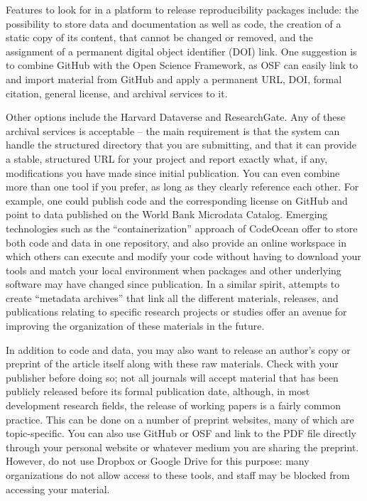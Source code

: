 Features to look for in a platform to release reproducibility packages include:
the possibility to store data and documentation as well as code,
the creation of a static copy of its content, that cannot be changed or removed,
and the assignment of a permanent digital object identifier (DOI) link.
One suggestion is to combine GitHub with the Open Science Framework,
as OSF can easily link to and import material from GitHub and
apply a permanent URL, DOI, formal citation, general license, and archival services to it.

Other options include the Harvard Dataverse
and ResearchGate.
Any of these archival services is acceptable --
the main requirement is that the system can handle
the structured directory that you are submitting,
and that it can provide a stable, structured URL for your project
and report exactly what, if any,
modifications you have made since initial publication.
You can even combine more than one tool if you prefer,
as long as they clearly reference each other.
For example, one could publish code and the corresponding license on GitHub
and point to data published on the World Bank Microdata Catalog.
Emerging technologies such as the ``containerization'' approach of CodeOcean
offer to store both code and data in one repository,
and also provide an online workspace in which others can execute and modify your code
without having to download your tools and match your local environment
when packages and other underlying software may have changed since publication.
In a similar spirit, attempts to create ``metadata archives''
that link all the different materials, releases, and publications
relating to specific research projects or studies
offer an avenue for improving the organization of these materials in the future.

In addition to code and data,
you may also want to release an author's copy or preprint
of the article itself along with these raw materials.
Check with your publisher before doing so;
not all journals will accept material that has been publicly released
before its formal publication date, although,
in most development research fields,
the release of working papers is a fairly common practice.
This can be done on a number of preprint websites,
many of which are topic-specific.
You can also use GitHub or OSF and link to the PDF file directly
through your personal website or whatever medium you are sharing the preprint.
However, do not use Dropbox or Google Drive for this purpose:
many organizations do not allow access to these tools,
and staff may be blocked from accessing your material.
